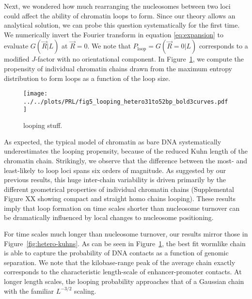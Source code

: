 \documentclass[%
 reprint,
superscriptaddress,
showpacs,preprintnumbers,
 amsmath,amssymb,
 aps,
 prl,
]{revtex4-1}
\newcommand{\greens}[2][\Omega_0; L]{G(#2|#1)}
\begin{document}
Next, we wondered how much rearranging the nucleosomes between two
    loci could affect the ability of chromatin loops to form.
Since our theory allows an analytical solution, we can probe this question
    systematically for the first time.
We numerically invert the Fourier transform in equation \ref{eq:expansion} to evaluate
    $\greens[L]{\vec{R}}$ at $\vec{R} = 0$.
We note that $P_\text{loop}=\greens[L]{\vec{R}=0}$ corresponds to a modified $J$-factor with no orientational component.
In Figure~\ref{fig:looping}, we compute the propensity of individual chromatin
    chains drawn from the maximum entropy distribution to form loops as a
    function of the loop size.

\begin{figure}
    \centering
    \texttt{[image: ../../plots/PRL/fig5\_looping\_hetero31to52bp\_bold3curves.pdf]}
    \caption{looping stuff.}\label{fig:looping}
\end{figure}

As expected, the typical model of chromatin as bare DNA systematically
    underestimates the looping propensity, because of the reduced Kuhn length of
    the chromatin chain.
Strikingly, we observe that the difference between the most- and least-likely to
    loop loci spans six orders of magnitude.
As suggested by our previous results, this huge inter-chain variability is
    driven primarily by the different geometrical properties of individual
    chromatin chains (Supplemental Figure XX showing compact and straight homo chains
    looping).
These results imply that loop formation on time scales shorter than nucleosome
    turnover can be dramatically influenced by local changes to nucleosome
    positioning.

For time scales much longer than nucleosome turnover, our results mirror those
    in Figure~\ref{fig:hetero-kuhns}.
As can be seen in Figure~\ref{fig:looping}, the best fit wormlike chain is able
    to capture the probability of DNA contacts as a function of genomic separation.
We note that the kilobase-range peak of the average chain exactly corresponds to
    the characteristic length-scale of enhancer-promoter contacts.
At longer length scales, the looping probability approaches that of a Gaussian
    chain with the familiar $L^{-3/2}$ scaling.
\end{document}
